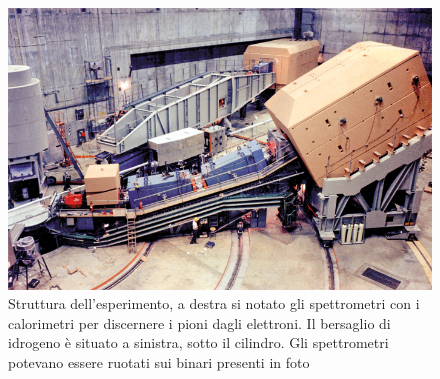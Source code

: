 \begin{figure}[hbtp]
\centering
\includegraphics[scale=0.5]{CCsla3_09_12.jpg}
\caption{Struttura dell'esperimento, a destra si notato gli spettrometri con i calorimetri per discernere i pioni dagli elettroni. Il bersaglio di idrogeno è situato a sinistra, sotto il cilindro. Gli spettrometri potevano essere ruotati sui binari presenti in foto }
\end{figure}
